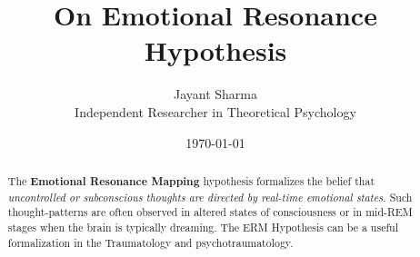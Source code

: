 \documentclass[9pt]{article}
\title{On Emotional Resonance Hypothesis}
\author{Jayant Sharma\\
\small Independent Researcher in Theoretical Psychology}
\date{\today}
\begin{document}
\maketitle

\begin{abstract}
The \textbf{Emotional Resonance Mapping} hypothesis formalizes the belief that \emph{uncontrolled or subconscious thoughts are directed by real-time emotional states.}
Such thought-patterns are often observed in altered states of consciousness or in mid-REM stages when the brain is typically dreaming.
The ERM Hypothesis can be a useful formalization in the Traumatology and psychotraumatology.
\end{abstract}





\end{document}
